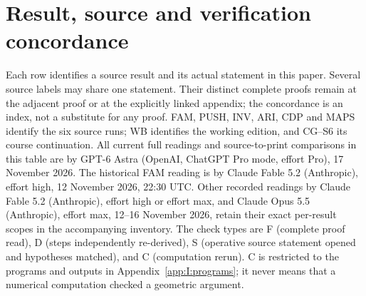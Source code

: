\section{Result, source and verification concordance}
\label{app:I:result-index}
Each row identifies a source result and its actual statement in this paper.
Several source labels may share one statement. Their distinct complete
proofs remain at the adjacent proof or at the explicitly linked appendix;
the concordance is an index, not a substitute for any proof.
FAM, PUSH, INV, ARI, CDP and MAPS identify the six source runs; WB identifies
the working edition, and CG--S6 its course continuation.
All current full readings and source-to-print comparisons in this table
are by GPT-6 Astra (OpenAI, ChatGPT Pro mode, effort Pro), 17 November 2026.
The historical FAM reading is by Claude Fable 5.2 (Anthropic), effort high,
12 November 2026, 22:30 UTC. Other recorded readings by Claude Fable 5.2
(Anthropic), effort high or effort max, and Claude Opus 5.5 (Anthropic),
effort max, 12--16 November 2026, retain their exact per-result scopes in
the accompanying inventory. The check types are F (complete proof read),
D (steps independently re-derived), S (operative source statement opened
and hypotheses matched), and C (computation rerun). C is restricted to the
programs and outputs in Appendix~\ref{app:I:programs}; it never means that
a numerical computation checked a geometric argument.

